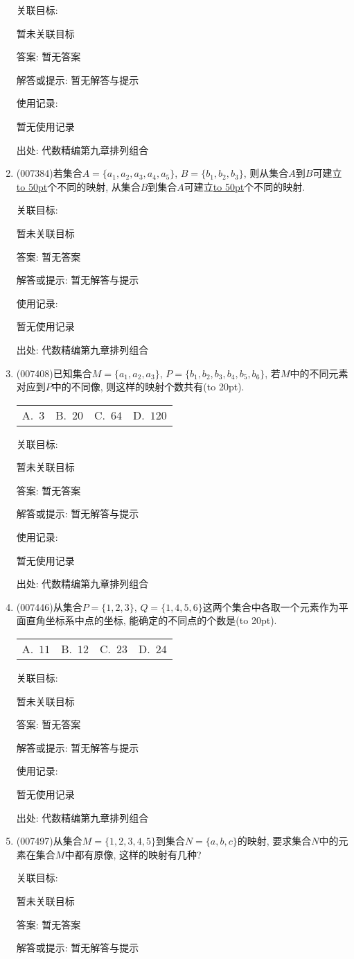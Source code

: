 \documentclass[10pt,a4paper]{article}
\newcommand{\blank}[1]{\underline{\hbox to #1pt{}}}
\newcommand{\bracket}[1]{(\hbox to #1pt{})}
\newcommand{\fourch}[4]{\par\begin{tabular}{p{.23\textwidth}p{.23\textwidth}p{.23\textwidth}p{.23\textwidth}}
A.~#1 &B.~#2& C.~#3& D.~#4
\end{tabular}}
\begin{document}
\begin{enumerate}[1.]
关联目标:

暂未关联目标

答案: 暂无答案

解答或提示: 暂无解答与提示

使用记录:

暂无使用记录


出处: 代数精编第九章排列组合
\item { (007384)}若集合$A=\{a_1,a_2,a_3,a_4,a_5\}$, $B=\{b_1,b_2,b_3\}$, 则从集合$A$到$B$可建立\blank{50}个不同的映射, 从集合$B$到集合$A$可建立\blank{50}个不同的映射.


关联目标:

暂未关联目标

答案: 暂无答案

解答或提示: 暂无解答与提示

使用记录:

暂无使用记录


出处: 代数精编第九章排列组合
\item { (007408)}已知集合$M=\{a_1,a_2,a_3\}$, $P=\{b_1,b_2,b_3,b_4,b_5,b_6\}$, 若$M$中的不同元素对应到$P$中的不同像, 则这样的映射个数共有\bracket{20}.
\fourch{$3$}{$20$}{$64$}{$120$}


关联目标:

暂未关联目标

答案: 暂无答案

解答或提示: 暂无解答与提示

使用记录:

暂无使用记录


出处: 代数精编第九章排列组合
\item { (007446)}从集合$P=\{1,2,3\}$, $Q=\{1,4,5,6\}$这两个集合中各取一个元素作为平面直角坐标系中点的坐标, 能确定的不同点的个数是\bracket{20}.
\fourch{$11$}{$12$}{$23$}{$24$}


关联目标:

暂未关联目标

答案: 暂无答案

解答或提示: 暂无解答与提示

使用记录:

暂无使用记录


出处: 代数精编第九章排列组合
\item { (007497)}从集合$M=\{1,2,3,4,5\}$到集合$N=\{a,b,c\}$的映射, 要求集合$N$中的元素在集合$M$中都有原像, 这样的映射有几种?


关联目标:

暂未关联目标

答案: 暂无答案

解答或提示: 暂无解答与提示


\end{enumerate}
\end{document}

